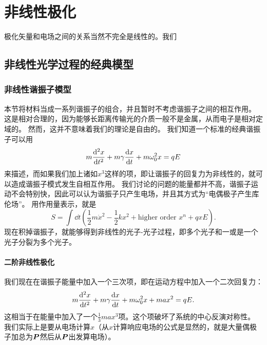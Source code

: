 \chapter{非线性极化}

极化矢量和电场之间的关系当然不完全是线性的。我们

\section{非线性光学过程的经典模型}\label{sec:classical-models}

\subsection{非线性谐振子模型}\label{sec:classical-oscillator}

本节将材料当成一系列谐振子的组合，并且暂时不考虑谐振子之间的相互作用。
这是相对合理的，因为能够长距离传输光的介质一般不是金属，从而电子是相对定域的。
然而，这并不意味着我们的理论是自由的。
我们知道一个标准的经典谐振子可以用
\begin{equation}
    m \dv[2]{x}{t} + m \gamma \dv{x}{t} + m \omega_0^2 x = q E
\end{equation}
来描述，而如果我们加上诸如$x^3$这样的项，即让谐振子的回复力为非线性的，就可以造成谐振子模式发生自相互作用。
我们讨论的问题的能量都并不高，谐振子运动不会特别快，因此可以认为谐振子只产生电场，并且其方式为“电偶极子产生库伦场”。
用作用量表示，就是%
\[
    S = \int \dd{t} \left( \frac{1}{2} m \dot{x}^2 - \frac{1}{2} k x^2 + \text{higher order $x^n$} + qxE \right).
\]
现在积掉谐振子，就能够得到非线性的光子-光子过程，即多个光子和一或是一个光子分裂为多个光子。

\subsubsection{二阶非线性极化}

我们现在在谐振子能量中加入一个三次项，即在运动方程中加入一个二次回复力：
\begin{equation}
    m \dv[2]{x}{t} + m \gamma \dv{x}{t} + m \omega_0^2 x + m a x^2 = q E.
    \label{eq:x3-eq}
\end{equation}
这相当于在能量中加入了一个$\frac{1}{3} m a x^3$项。这个项破坏了系统的中心反演对称性。
我们实际上是要从电场计算$x$（从$x$计算响应电场的公式是显然的，就是大量偶极子加总为$\vb*{P}$然后从$\vb*{P}$出发算电场）。

